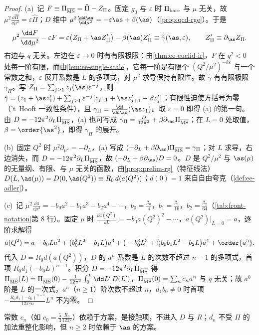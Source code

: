\begin{proof}
(a)~记 $F\equiv\Pi_{\overline{\rm MS}}=\hat\Pi-Z_\Pi$。固定 $g_0$ 与 $\varepsilon$ 时 $\Pi_{\rm bare}$ 与 $\mu$ 无关，故 $\mu^2\frac{\dd\hat\Pi}{\dd\mu^2}=\varepsilon\hat\Pi$；$D$ 维中 $\mu^2\frac{\dd\as}{\dd\mu^2}=-\varepsilon\as+\beta(\as)$（\cref{prop:qcd-rge}）。于是
\begin{equation}\label{eq:ee-rge-eps}
\mu^2\frac{\dd F}{\dd\mu^2}-\varepsilon F=\varepsilon\big(Z_\Pi+\as Z_\Pi'\big)-\beta(\as)Z_\Pi'\equiv\hat\gamma(\as,\varepsilon),\qquad Z_\Pi'\equiv\partial_{\as}Z_\Pi .
\end{equation}
右边与 $q$ 无关。左边在 $\varepsilon\to0$ 时有有限极限：由\cref{thm:ee-euclid-ir}，$F$ 在 $q^2<0$ 处每一阶有限，而由\cref{lem:ee-single-scale}，它每一阶是有限个 $(Q^2/\mu^2)^{-k\varepsilon}$ 与一个常数之和，$\varepsilon$ 展开系数是 $L$ 的多项式，对 $\mu^2$ 求导保持有限性。故 $\hat\gamma$ 有有限极限 $\gamma_\Pi$。写 $Z_\Pi=\sum_{j\ge1}z_j(\as)\varepsilon^{-j}$，则 $\hat\gamma=(z_1+\as z_1')+\sum_{j\ge1}\varepsilon^{-j}[z_{j+1}+\as z_{j+1}'-\beta z_j']$；有限性迫使方括号为零（'t~Hooft 一致性条件），且 $\gamma_\Pi=\frac{\dd}{\dd\as}(\as z_1)$。取 $\varepsilon=0$ 即得 (a) 的第一句。由 $D=-12\pi^2\partial_L\Pi_{\overline{\rm MS}}$，(a) 也可写成 $\gamma_\Pi=\frac{D}{12\pi^2}+\beta\partial_{\as}\Pi_{\overline{\rm MS}}$；在 $L=0$ 处取值，$\beta=\order{\as^2}$，即得 $\gamma_\Pi$ 的展开。

(b)~固定 $Q^2$ 时 $\mu^2\partial_{\mu^2}=-\partial_L$，(a) 写成 $(-\partial_L+\beta\partial_{\as})\Pi_{\overline{\rm MS}}=\gamma_\Pi$；对 $L$ 求导，右边消失，而 $D=-12\pi^2\partial_L\Pi_{\overline{\rm MS}}$，故 $(-\partial_L+\beta\partial_{\as})D=0$。$D$ 是 $Q^2/\mu^2$ 与 $\as(\mu)$ 的无量纲、有限、与 $\mu$ 无关的函数，由\cref{prop:prelim-rg}（特征线法）$D(L,\as(\mu))=D(0,\as(Q^2))\equiv R_0\,d(a(Q^2))$；$d(0)=1$ 来自自由夸克（\cref{def:ee-adler}）。

(c)~记 $\mu^2\frac{\dd a}{\dd\mu^2}=-b_0a^2-b_1a^3-b_2a^4-\cdots$，$b_0=\frac{\beta_0}4$，$b_1=\frac{\beta_1}{16}$，$b_2=\frac{\beta_2}{64}$（\cref{tab:front-notation}第 8 行）。固定 $\mu$ 时 $\frac{\dd a(Q^2)}{\dd L}=-b_0a(Q^2)^2-\cdots$，$a(Q^2)|_{L=0}=a$，逐阶求解得
\begin{equation}\label{eq:ee-arun}
a(Q^2)=a-b_0La^2+\big(b_0^2L^2-b_1L\big)a^3+\big(-b_0^3L^3+\tfrac52b_0b_1L^2-b_2L\big)a^4+\order{a^5}.
\end{equation}
代入 $D=R_0d(a(Q^2))$，$D$ 的 $a^n$ 系数是 $L$ 的次数不超过 $n-1$ 的多项式，首项 $R_0d_1(-b_0L)^{n-1}$。积分 $D=-12\pi^2\partial_L\Pi_{\overline{\rm MS}}$ 得 $\Pi_{\overline{\rm MS}}(L)=\Pi_{\overline{\rm MS}}(0)-\frac1{12\pi^2}\int_0^L\dd L'\,D(L')$，$\Pi_{\overline{\rm MS}}(0)=\sum_nc_na^n$ 与 $q$ 无关；故 $a^0$ 阶是 $L$ 的一次式，$a^n$（$n\ge1$）阶次数不超过 $n$，$d_1b_0\ne0$ 时首项 $-\frac{R_0d_1(-b_0)^{n-1}}{12\pi^2n}L^n$ 不为零。
\end{proof}
常数 $c_n$（如 $c_0=\frac53\frac{R_0}{12\pi^2}$）依赖于方案，是接触项，不进入 $D$ 与 $R$；$d_n$ 不受 $\Pi$ 的加法重整化影响，但 $n\ge2$ 时依赖于 $\as$ 的方案。

